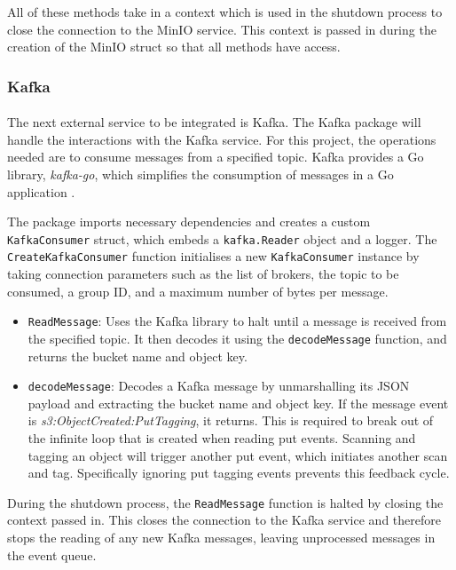 \documentclass[12pt, conference, final, a4paper, onecolumn, compsoc]{IEEEtran}
\begin{document}
All of these methods take in a context which is used in the shutdown process to
close the connection to the MinIO service. This context is passed in during the
creation of the MinIO struct so that all methods have access.

\subsubsection*{Kafka}
\paragraph{}

The next external service to be integrated is Kafka. The Kafka package will
handle the interactions with the Kafka service. For this project, the operations
needed are to consume messages from a specified topic. Kafka provides a Go
library, \textit{kafka-go}, which simplifies the consumption of messages in a Go
application \citep{kafka-go-repo}.

The package imports necessary dependencies and creates a custom
\texttt{KafkaConsumer} struct, which embeds a \texttt{kafka.Reader} object and a
logger. The \texttt{CreateKafkaConsumer} function initialises a new
\texttt{KafkaConsumer} instance by taking connection parameters such as the list
of brokers, the topic to be consumed, a group ID, and a maximum number of bytes
per message.

\begin{itemize}
  \item \texttt{ReadMessage}: Uses the Kafka library to halt until a message is
        received from the specified topic. It then decodes it using the
        \texttt{decodeMessage} function, and returns the bucket name and object
        key.
  \item \texttt{decodeMessage}: Decodes a Kafka message by unmarshalling its
        JSON payload and extracting the bucket name and object key. If the
        message event is \textit{s3:ObjectCreated:PutTagging}, it returns. This
        is required to break out of the infinite loop that is created when
        reading put events. Scanning and tagging an object will trigger another
        put event, which initiates another scan and tag. Specifically ignoring
        put tagging events prevents this feedback cycle.
\end{itemize}

During the shutdown process, the \texttt{ReadMessage} function is halted by
closing the context passed in. This closes the connection to the Kafka service
and therefore stops the reading of any new Kafka messages, leaving unprocessed
messages in the event queue.
\end{document}
